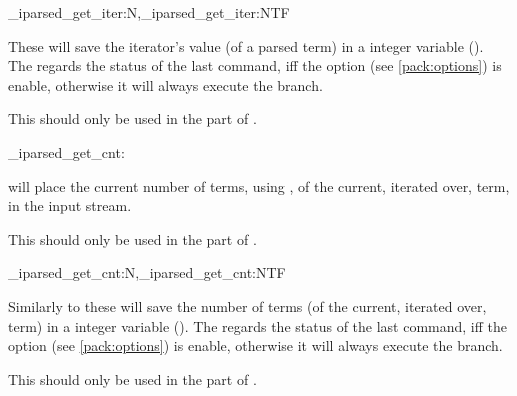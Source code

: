 \documentclass[10pt]{article}
\begin{document}
\begin{codedescribe}[code,new=2026/02/01]{\starray_iparsed_get_iter:N,\starray_iparsed_get_iter:NTF}
\begin{codesyntax}%
\end{codesyntax}
These will save the iterator’s value (of a parsed term) in a integer variable (\cite{expl3}). The  regards the status of the last  command, iff the option  (see \ref{pack:options}) is enable, otherwise it will always execute the  branch.
\end{codedescribe}
\begin{tsremark}
This should only be used in the  part of .
\end{tsremark}

\begin{codedescribe}[code,EXP,new=2026/02/01]{\starray_iparsed_get_cnt:}
\begin{codesyntax}%
\end{codesyntax}
 will place the current number of terms, using , of the current, iterated over, term, in the input stream.
\end{codedescribe}
\begin{tsremark}
This should only be used in the  part of .
\end{tsremark}

\begin{codedescribe}[code,new=2026/02/01]{\starray_iparsed_get_cnt:N,\starray_iparsed_get_cnt:NTF}
\begin{codesyntax}%
\end{codesyntax}
Similarly to  these will save  the number of terms (of the current, iterated over, term) in a integer variable (\cite{expl3}). The  regards the status of the last  command, iff the option  (see \ref{pack:options}) is enable, otherwise it will always execute the  branch.
\end{codedescribe}
\begin{tsremark}
This should only be used in the  part of .
\end{tsremark}
\end{document}
